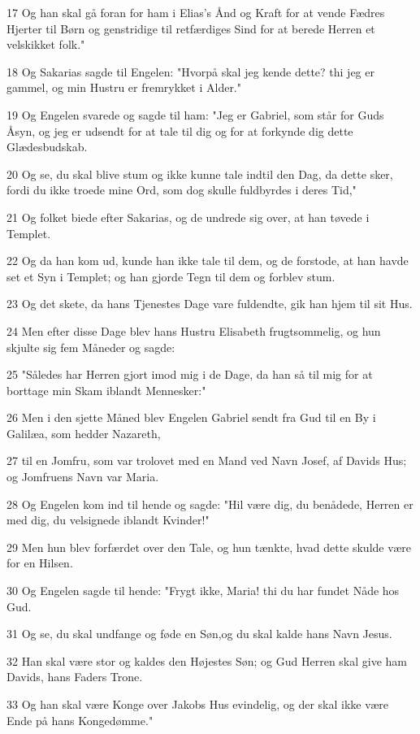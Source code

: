 \par 17 Og han skal gå foran for ham i Elias's Ånd og Kraft for at vende Fædres Hjerter til Børn og genstridige til retfærdiges Sind for at berede Herren et velskikket folk."
\par 18 Og Sakarias sagde til Engelen: "Hvorpå skal jeg kende dette? thi jeg er gammel, og min Hustru er fremrykket i Alder."
\par 19 Og Engelen svarede og sagde til ham: "Jeg er Gabriel, som står for Guds Åsyn, og jeg er udsendt for at tale til dig og for at forkynde dig dette Glædesbudskab.
\par 20 Og se, du skal blive stum og ikke kunne tale indtil den Dag, da dette sker, fordi du ikke troede mine Ord, som dog skulle fuldbyrdes i deres Tid,"
\par 21 Og folket biede efter Sakarias, og de undrede sig over, at han tøvede i Templet.
\par 22 Og da han kom ud, kunde han ikke tale til dem, og de forstode, at han havde set et Syn i Templet; og han gjorde Tegn til dem og forblev stum.
\par 23 Og det skete, da hans Tjenestes Dage vare fuldendte, gik han hjem til sit Hus.
\par 24 Men efter disse Dage blev hans Hustru Elisabeth frugtsommelig, og hun skjulte sig fem Måneder og sagde:
\par 25 "Således har Herren gjort imod mig i de Dage, da han så til mig for at borttage min Skam iblandt Mennesker:"
\par 26 Men i den sjette Måned blev Engelen Gabriel sendt fra Gud til en By i Galilæa, som hedder Nazareth,
\par 27 til en Jomfru, som var trolovet med en Mand ved Navn Josef, af Davids Hus; og Jomfruens Navn var Maria.
\par 28 Og Engelen kom ind til hende og sagde: "Hil være dig, du benådede, Herren er med dig, du velsignede iblandt Kvinder!"
\par 29 Men hun blev forfærdet over den Tale, og hun tænkte, hvad dette skulde være for en Hilsen.
\par 30 Og Engelen sagde til hende: "Frygt ikke, Maria! thi du har fundet Nåde hos Gud.
\par 31 Og se, du skal undfange og føde en Søn,og du skal kalde hans Navn Jesus.
\par 32 Han skal være stor og kaldes den Højestes Søn; og Gud Herren skal give ham Davids, hans Faders Trone.
\par 33 Og han skal være Konge over Jakobs Hus evindelig, og der skal ikke være Ende på hans Kongedømme."
